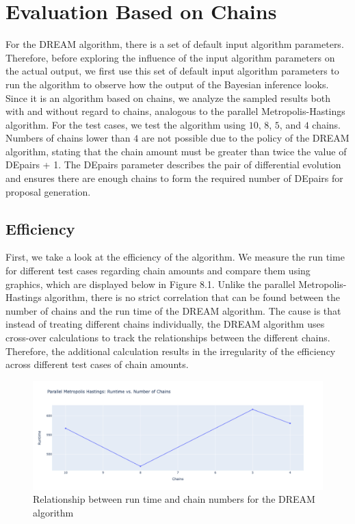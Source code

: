 \section{Evaluation Based on Chains}
For the DREAM algorithm, there is a set of default input algorithm parameters. Therefore, before exploring the influence of the input algorithm parameters on the actual output, we first use this set of default input algorithm parameters to run the algorithm to observe how the output of the Bayesian inference looks. Since it is an algorithm based on chains, we analyze the sampled results both with and without regard to chains, analogous to the parallel Metropolis-Hastings algorithm. For the test cases, we test the algorithm using $10$, $8$, $5$, and $4$ chains. Numbers of chains lower than $4$ are not possible due to the policy of the DREAM algorithm, stating that the chain amount must be greater than twice the value of DEpairs + 1. The DEpairs parameter describes the pair of differential evolution and ensures there are enough chains to form the required number of DEpairs for proposal generation.


\subsection{Efficiency}
First, we take a look at the efficiency of the algorithm. We measure the run time for different test cases regarding chain amounts and compare them using graphics, which are displayed below in Figure 8.1. Unlike the parallel Metropolis-Hastings algorithm, there is no strict correlation that can be found between the number of chains and the run time of the DREAM algorithm. The cause is that instead of treating different chains individually, the DREAM algorithm uses cross-over calculations to track the relationships between the different chains. Therefore, the additional calculation results in the irregularity of the efficiency across different test cases of chain amounts.

\begin{figure}[H]
    \centering
    \includegraphics[width=1\textwidth]{figures/dream/runtime.png}
    \captionsetup{width=.8\textwidth}
    \caption{Relationship between run time and chain numbers for the DREAM algorithm}
    \label{fig:enter-label}
\end{figure}
